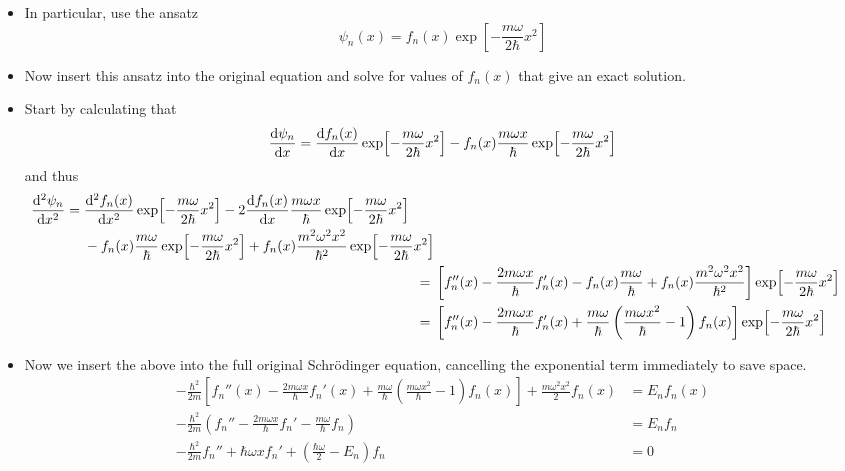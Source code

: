 \documentclass[../notes.tex]{subfiles}
\begin{document}
\begin{itemize}
\begin{itemize}
        \item In particular, use the ansatz
        \begin{equation*}
            \psi_n(x) = f_n(x)\exp[-\frac{m\omega}{2\hbar}x^2]
        \end{equation*}
        \item Now insert this ansatz into the original equation and solve for values of $f_n(x)$ that give an exact solution.
        \item Start by calculating that
        \begin{equation*}
            \dv{\psi_n}{x} = \dv{f_n(x)}{x}\exp[-\frac{m\omega}{2\hbar}x^2]-f_n(x)\frac{m\omega x}{\hbar}\exp[-\frac{m\omega}{2\hbar}x^2]
        \end{equation*}
        and thus
        \begin{align*}
            \begin{split}
                \dv[2]{\psi_n}{x} ={}& \dv[2]{f_n(x)}{x}\exp[-\frac{m\omega}{2\hbar}x^2]-2\dv{f_n(x)}{x}\frac{m\omega x}{\hbar}\exp[-\frac{m\omega}{2\hbar}x^2]\\
                & -f_n(x)\frac{m\omega}{\hbar}\exp[-\frac{m\omega}{2\hbar}x^2]+f_n(x)\frac{m^2\omega^2x^2}{\hbar^2}\exp[-\frac{m\omega}{2\hbar}x^2]
            \end{split}\\
            ={}& \left[ f_n''(x)-\frac{2m\omega x}{\hbar}f_n'(x)-f_n(x)\frac{m\omega}{\hbar}+f_n(x)\frac{m^2\omega^2x^2}{\hbar^2} \right]\exp[-\frac{m\omega}{2\hbar}x^2]\\
            ={}& \left[ f_n''(x)-\frac{2m\omega x}{\hbar}f_n'(x)+\frac{m\omega}{\hbar}\left( \frac{m\omega x^2}{\hbar}-1 \right)f_n(x) \right]\exp[-\frac{m\omega}{2\hbar}x^2]
        \end{align*}
        \item Now we insert the above into the full original Schr\"{o}dinger equation, cancelling the exponential term immediately to save space.
        \begin{align*}
            -\frac{\hbar^2}{2m}\left[ f_n''(x)-\frac{2m\omega x}{\hbar}f_n'(x)+\frac{m\omega}{\hbar}\left( \frac{m\omega x^2}{\hbar}-1 \right)f_n(x) \right]+\frac{m\omega^2x^2}{2}f_n(x) &= E_nf_n(x)\\
            -\frac{\hbar^2}{2m}\left( f_n''-\frac{2m\omega x}{\hbar}f_n'-\frac{m\omega}{\hbar}f_n \right) &= E_nf_n\\
            -\frac{\hbar^2}{2m}f_n''+\hbar\omega xf_n'+\left( \frac{\hbar\omega}{2}-E_n \right)f_n &= 0
        \end{align*}

\end{itemize}
\end{itemize}
\end{document}
